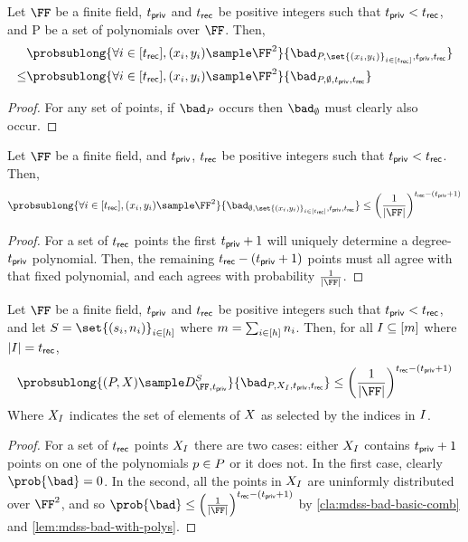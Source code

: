 \begin{lemma}
	\label{lem:mdss-bad-with-polys}
	Let $\FF$ be a finite field, $t_{\mathsf{priv}}$ and $t_{\mathsf{rec}}$ be positive integers such that $t_{\mathsf{priv}} < t_{\mathsf{rec}}$, and P be a set of polynomials over $\FF$. Then,
	\begin{align*}
		     & \probsublong{\forall i \in [\mdssRecThr], (x_i, y_i) \sample \FF^2}{\bad_{P, \set{(x_i, y_i)}_{i \in [\mdssRecThr]}, \mdssPrivThr, \mdssRecThr}} \\
		\leq & \probsublong{\forall i \in [\mdssRecThr], (x_i, y_i) \sample \FF^2}{\bad_{P, \emptyset, \mdssPrivThr, \mdssRecThr}}
	\end{align*}
\end{lemma}
\begin{proof}
	For any set of points, if $\bad_{\mdssPolySet}$ occurs then $\bad_{\emptyset}$ must clearly also occur.
\end{proof}

\begin{claim}
	\label{cla:mdss-bad-basic-comb}
	Let $\FF$ be a finite field, and $t_{\mathsf{priv}}$, $t_{\mathsf{rec}}$ be positive integers such that $t_{\mathsf{priv}} < t_{\mathsf{rec}}$. Then,
	$$
		\probsublong{\forall i \in [\mdssRecThr], (x_i, y_i) \sample \FF^2}{\bad_{\emptyset, \set{(x_i, y_i)}_{i \in [\mdssRecThr]}, \mdssPrivThr, \mdssRecThr}}
		\leq \mdssFieldBound
	$$
\end{claim}
\begin{proof}
	For a set of $t_{\mathsf{rec}}$ points the first $t_{\mathsf{priv}} + 1$ will uniquely determine a degree-$t_{\mathsf{priv}}$ polynomial.
	Then, the remaining $t_{\mathsf{rec}} - (t_{\mathsf{priv}} + 1)$ points must all agree with that fixed polynomial, and each agrees with probability $\frac{1}{|\FF|}$.
\end{proof}

\begin{claim}
	\label{cla:mdss-bad-from-dist}
	Let $\FF$ be a finite field, $t_{\mathsf{priv}}$ and $t_{\mathsf{rec}}$ be positive integers such that $t_{\mathsf{priv}} < t_{\mathsf{rec}}$, and let  $S = \set{(\mdssSecret_i, \mdssNumShares_i)}_{i \in [\mdssNumShareSets]}$ where $m = \sum_{i \in [h]} n_i$.
	Then, for all $I \subseteq [m]$ where $|I| = t_{\mathsf{rec}}$,
	$$
		\probsublong{(\mdssPolySet, \mdssPointSet) \sample \mdssHonestDist{\FF}{\mdssPrivThr}{S}}{\bad_{\mdssPolySet, \mdssPointSet_{\indexSet}, \mdssPrivThr, \mdssRecThr}} \leq \mdssFieldBound
	$$
	Where $X_{I}$ indicates the set of elements of $X$ as selected by the indices in $I$.
\end{claim}
\begin{proof}
	For a set of $t_{\mathsf{rec}}$ points $X_{I}$ there are two cases: either $X_{I}$ contains $t_{\mathsf{priv}} + 1$ points on one of the polynomials $p \in P$ or it does not.
	In the first case, clearly $\prob{\bad} = 0$.
	In the second, all the points in $X_{I}$ are uninformly distributed over $\FF^2$, and so $\prob{\bad} \leq \mdssFieldBound$ by \cref{cla:mdss-bad-basic-comb} and \cref{lem:mdss-bad-with-polys}.
\end{proof}

